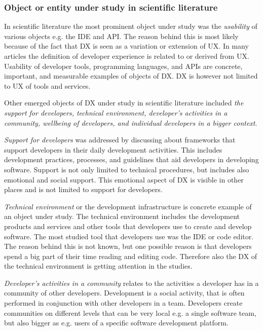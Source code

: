 \documentclass[english, 12pt, a4paper, sci, utf8, a-1b, online]{aaltothesis}
\begin{document}
\subsubsection{Object or entity under study in scientific literature}

In scientific literature the most prominent object under study was the \textit{usability} of various objects e.g. the IDE and API. The reason behind this is most likely because of the fact that DX is seen as a variation or extension of UX. In many articles the definition of developer experience is related to or derived from UX. Usability of developer tools, programming languages, and APIs are concrete, important, and measurable examples of objects of DX. DX is however not limited to UX of tools and services.

Other emerged objects of DX under study in scientific literature included \textit{the support for developers, technical environment, developer's activities in a community, wellbeing of developers, and individual developers in a bigger context}.

\textit{Support for developers} was addressed by discussing about frameworks that support developers in their daily development activities. This includes development practices, processes, and guidelines that aid developers in developing software. Support is not only limited to technical procedures, but includes also emotional and social support. This emotional aspect of DX is visible in other places and is not limited to support for developers.

\textit{Technical environment} or the development infrastructure is concrete example of an object under study. The technical environment includes the development products and services and other tools that developers use to create and develop software. The most studied tool that developers use was the IDE or code editor. The reason behind this is not known, but one possible reason is that developers spend a big part of their time reading and editing code. Therefore also the DX of the technical environment is getting attention in the studies.

\textit{Developer's activities in a community} relates to the activities a developer has in a community of other developers. Development is a social activity, that is often performed in conjunction with other developers in a team. Developers create communities on different levels that can be very local e.g. a single software team, but also bigger as e.g. users of a specific software development platform.
\end{document}
